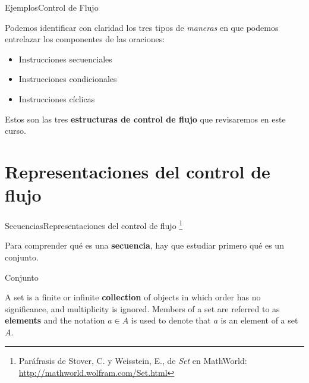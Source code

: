\documentclass[spanish, c, handout]{beamer}
\newcommand\blfootnote[1]{%
\begingroup
\renewcommand\thefootnote{}\footnote{#1}%
\addtocounter{footnote}{-1}%
\endgroup
}
\begin{document}
\begin{frame}{Ejemplos}{Control de Flujo}

    Podemos identificar con claridad los tres tipos de \textit{maneras} en que podemos entrelazar los componentes de las oraciones: \pause

    \bigskip

    \begin{itemize}
        \item Instrucciones \alert{secuenciales}  \pause
        \item Instrucciones \alert{condicionales}  \pause
        \item Instrucciones \alert{cíclicas}  \pause
    \end{itemize}

    \bigskip
    
    Estos son las tres \textbf{estructuras de control de flujo} que revisaremos en este curso.
\end{frame}

\section{Representaciones del control de flujo}

\begin{frame}{Secuencias}{Representaciones del control de flujo}
    \blfootnote{Paráfrasis de Stover, C. y Weisstein, E., de \textit{Set} en MathWorld: \url{http://mathworld.wolfram.com/Set.html}}
    Para comprender qué es una \textbf{secuencia}, hay que estudiar primero qué es un \alert{conjunto}. \pause

    \bigskip

    \begin{block}{Conjunto}
        \begin{displayquote}
            A \alert{set} is a finite or infinite \textbf{collection} of objects in which order has no significance, and multiplicity is ignored.
            Members of a set are referred to as \textbf{elements} and the notation $a \in A$ is used to denote that $a$ is an element of a set $A$.
        \end{displayquote}
    \end{block}
\end{frame}
\end{document}
